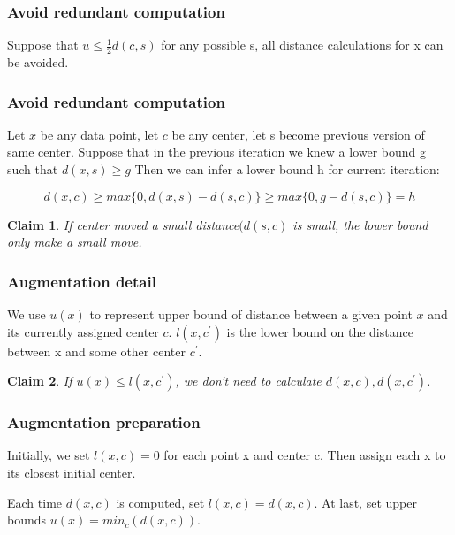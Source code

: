 \documentclass[9pt]{beamer}
\newtheorem{claim}{Claim}
\newcommand{\ccp}[1]{{\color{purple}#1}}
\begin{document}
\begin{frame}
	\frametitle{Avoid redundant computation}
	\begin{corollary}
Suppose that $u \le \frac{1}{2}d(c, s)$ for any possible s, all distance calculations for x can be avoided. 
\end{corollary}
\end{frame}

\begin{frame}
\frametitle{Avoid redundant computation}
Let $x$ be any data point, let $c$ be any center, let s become previous version of same center. Suppose that in the previous iteration we knew a lower bound g such that $d(x, s) \ge g$ Then we can infer a lower bound h for current iteration: \par
\begin{equation*}	
	d(x, c) \ge max\{0, d(x,s)-d(s,c)\} \ge max\{0, g-d(s,c)\} = h
	\end{equation*}
\pause
\begin{claim}
\ccp{If center moved a small distance$(d(s,c)$ is small}, the lower bound only make a small move.
\end{claim}
\end{frame}



\begin{frame}
	\frametitle{Augmentation detail}
 We use $u(x)$ to represent upper bound of distance between a given point $x$ and its currently assigned center $c$. $l(x,c^{\prime})$ is the lower bound on the distance between x and some other center $c^{\prime}$.\par
\begin{claim}
If $u(x) \le l(x,c^{\prime}) $, we don't need to calculate $d(x,c), d(x, c^{\prime})$. \par
\end{claim}
\end{frame}

\begin{frame}
	\frametitle{Augmentation preparation}
 Initially, we set $l(x,c)=0$ for each point x and center c. Then assign each x to its closest initial center.\par
Each time $d(x,c)$ is computed, set $l(x,c)=d(x,c)$. At last, set upper bounds $u(x) = min_c(d(x,c))$.

\end{frame}
\end{document}
